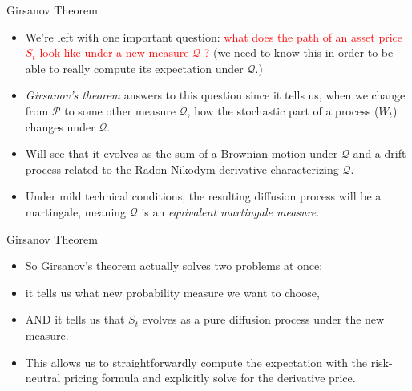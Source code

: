 \documentclass{beamer}
\begin{document}
\begin{frame}{Girsanov Theorem}
	\begin{itemize}
		\item We're left with one important question:
		\textcolor{red}{what does the path of an asset price $S_t$ look like under a new measure $\mathcal{Q}$ ?} (we need to know this in order to be able to really compute its expectation under $\mathcal{Q}$.)
		\item \emph{Girsanov's theorem} answers to this question since it tells us, when we change from $\mathcal{P}$ to some other measure $\mathcal{Q}$, how the stochastic part of a process ($W_t$) changes under $\mathcal{Q}$.
		\item Will see that it evolves as the sum of a Brownian motion under $\mathcal{Q}$ and a drift process related to the Radon-Nikodym derivative characterizing $\mathcal{Q}$.
		\item Under mild technical conditions, the resulting diffusion process will be a martingale, meaning $\mathcal{Q}$ is an \emph{equivalent martingale measure}.
	\end{itemize}
\end{frame}
 
\begin{frame}{Girsanov Theorem}
	\begin{itemize}
		\item So Girsanov's theorem actually solves two problems at once: 
		\item it tells us what new probability measure we want to choose, 
		\item AND it tells us that $S_t$ evolves as a pure diffusion process under the new measure. 
		\item This allows us to straightforwardly compute the expectation with the risk-neutral pricing formula and explicitly solve for the derivative price.
	\end{itemize}
\end{frame}
\end{document}
